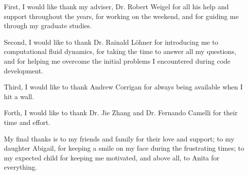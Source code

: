 \documentclass[11pt]{report}
\begin{document}

\acknowledgementspage

\noindent First, I would like thank my adviser, Dr. Robert Weigel for all his help and support throughout the years, for working on the weekend, and for guiding me through my graduate studies. 

Second, I would like to thank Dr. Rainald L{\"o}hner for introducing me to computational fluid dynamics, for taking the time to answer all my questions, and for helping me overcome the initial problems I encountered during code development.  

Third, I would like to thank Andrew Corrigan for always being available when I hit a wall.

Forth, I would like to thank Dr. Jie Zhang and Dr. Fernando Camelli for their time and effort. 
 
My final thanks is to my friends and family for their love and support; to my daughter Abigail, for keeping a smile on my face during the frustrating times; to my expected child for keeping me motivated, and above all, to Anita for everything.


\tableofcontents

\listoftables

\listoffigures

\printglossary[type=\acronymtype,title=Abbreviations]

\abstractpage
\end{document}
